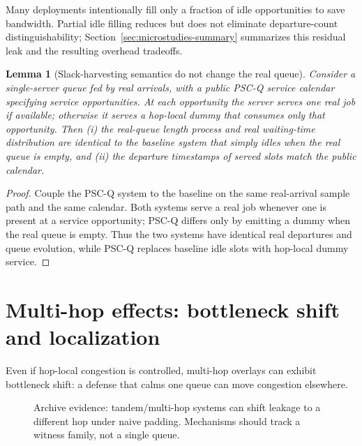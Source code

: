 \documentclass[11pt]{article}
\newtheorem{lemma}{Lemma}
\theoremstyle{definition}
\theoremstyle{remark}
\begin{document}
Many deployments intentionally fill only a fraction of idle opportunities to save bandwidth.
Partial idle filling reduces but does not eliminate departure-count distinguishability; Section~\ref{sec:microstudies-summary} summarizes this residual leak and the resulting overhead tradeoffs.

\begin{lemma}[Slack-harvesting semantics do not change the real queue]
Consider a single-server queue fed by \emph{real} arrivals, with a public PSC-Q service calendar specifying service opportunities.
At each opportunity the server serves one real job if available; otherwise it serves a hop-local dummy that consumes only that opportunity.
Then (i) the real-queue length process and real waiting-time distribution are identical to the baseline system that simply idles when the real queue is empty, and (ii) the departure timestamps of \emph{served slots} match the public calendar.
\end{lemma}

\begin{proof}
Couple the PSC-Q system to the baseline on the same real-arrival sample path and the same calendar.
Both systems serve a real job whenever one is present at a service opportunity; PSC-Q differs only by emitting a dummy when the real queue is empty.
Thus the two systems have identical real departures and queue evolution, while PSC-Q replaces baseline idle slots with hop-local dummy service.
\end{proof}

\section{Multi-hop effects: bottleneck shift and localization}
Even if hop-local congestion is controlled, multi-hop overlays can exhibit bottleneck shift: a defense that calms one queue can move congestion elsewhere.

\begin{figure}[t]
\centering
{}
\caption{Archive evidence: tandem/multi-hop systems can shift leakage to a different hop under naive padding. Mechanisms should track a witness family, not a single queue.}
\label{fig:tandem}
\end{figure}
\end{document}
